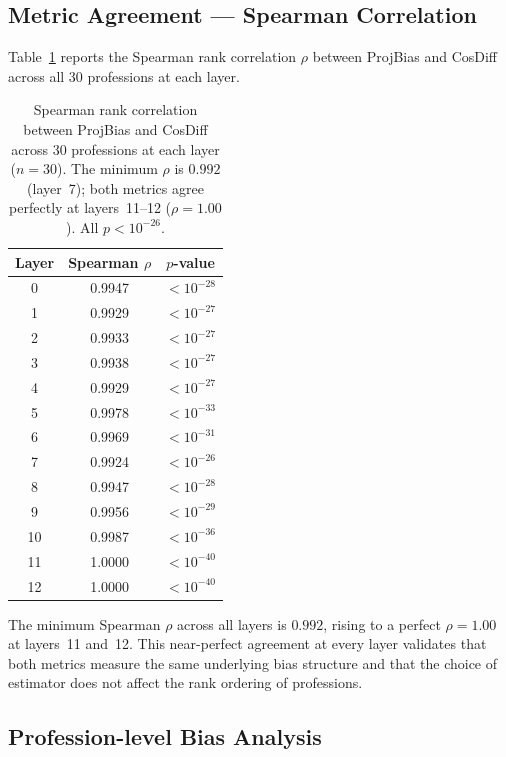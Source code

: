\documentclass[11pt,a4paper]{article}
\begin{document}
\subsection{Metric Agreement — Spearman Correlation}

Table~\ref{tab:spearman} reports the Spearman rank correlation $\rho$ between
ProjBias and CosDiff across all 30 professions at each layer.

\begin{table}[h]
\centering
\small
\begin{tabular}{ccc}
\toprule
\textbf{Layer} & \textbf{Spearman $\rho$} & \textbf{$p$-value} \\
\midrule
 0 & 0.9947 & $< 10^{-28}$ \\
 1 & 0.9929 & $< 10^{-27}$ \\
 2 & 0.9933 & $< 10^{-27}$ \\
 3 & 0.9938 & $< 10^{-27}$ \\
 4 & 0.9929 & $< 10^{-27}$ \\
 5 & 0.9978 & $< 10^{-33}$ \\
 6 & 0.9969 & $< 10^{-31}$ \\
 7 & 0.9924 & $< 10^{-26}$ \\
 8 & 0.9947 & $< 10^{-28}$ \\
 9 & 0.9956 & $< 10^{-29}$ \\
10 & 0.9987 & $< 10^{-36}$ \\
11 & 1.0000 & $< 10^{-40}$ \\
12 & 1.0000 & $< 10^{-40}$ \\
\bottomrule
\end{tabular}
\caption{Spearman rank correlation between ProjBias and CosDiff across 30
professions at each layer ($n=30$). The minimum $\rho$ is $0.992$ (layer~7);
both metrics agree perfectly at layers~11--12 ($\rho=1.00$). All $p < 10^{-26}$.}
\label{tab:spearman}
\end{table}

The minimum Spearman $\rho$ across all layers is $0.992$, rising to a perfect
$\rho = 1.00$ at layers~11 and~12. This near-perfect agreement at every layer
validates that both metrics measure the same underlying bias structure and that
the choice of estimator does not affect the rank ordering of professions.

\subsection{Profession-level Bias Analysis}
\end{document}
